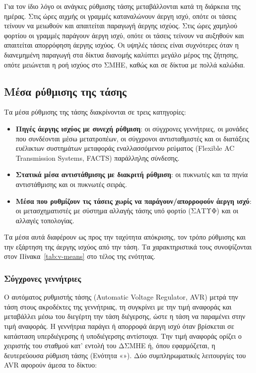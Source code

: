 Για τον ίδιο λόγο οι ανάγκες ρύθμισης τάσης μεταβάλλονται κατά τη διάρκεια της ημέρας. Στις
ώρες αιχμής οι γραμμές καταναλώνουν άεργη ισχύ, οπότε οι τάσεις τείνουν να μειωθούν και
απαιτείται παραγωγή άεργης ισχύος. Στις ώρες χαμηλού φορτίου οι γραμμές παράγουν άεργη ισχύ,
οπότε οι τάσεις τείνουν να αυξηθούν και απαιτείται απορρόφηση άεργης ισχύος. Οι υψηλές τάσεις
είναι συχνότερες όταν η διανεμημένη παραγωγή στα δίκτυα διανομής καλύπτει μεγάλο μέρος της
ζήτησης, οπότε μειώνεται η ροή ισχύος στο ΣΜΗΕ, καθώς και σε δίκτυα με πολλά καλώδια.

\subsection{Μέσα ρύθμισης της τάσης}
\label{sec:q-sources}

Τα μέσα ρύθμισης της τάσης διακρίνονται σε τρεις κατηγορίες:

\begin{itemize}
\item \textbf{Πηγές άεργης ισχύος με συνεχή ρύθμιση}: οι σύγχρονες γεννήτριες, οι μονάδες που
      συνδέονται μέσω μετατροπέων, οι σύγχρονοι αντισταθμιστές και οι διατάξεις ευέλικτων
      συστημάτων μεταφοράς εναλλασσόμενου ρεύματος (Flexible AC Transmission Systems, FACTS)
      παράλληλης σύνδεσης.
\item \textbf{Στατικά μέσα αντιστάθμισης με διακριτή ρύθμιση}: οι πυκνωτές και τα πηνία
      αντιστάθμισης και οι πυκνωτές σειράς.
\item \textbf{Μέσα που ρυθμίζουν τις τάσεις χωρίς να παράγουν/απορροφούν άεργη ισχύ}: οι
      μετασχηματιστές με σύστημα αλλαγής τάσης υπό φορτίο (ΣΑΤΥΦ) και οι αλλαγές τοπολογίας.
\end{itemize}

Τα μέσα αυτά διαφέρουν ως προς την ταχύτητα απόκρισης, τον τρόπο ρύθμισης και την εξάρτηση
της άεργης ισχύος από την τάση. Τα χαρακτηριστικά τους συνοψίζονται στον
Πίνακα~\ref{tab:v-means} στο τέλος της ενότητας.

\subsubsection{Σύγχρονες γεννήτριες}
\label{sec:sg}

Ο αυτόματος ρυθμιστής τάσης (Automatic Voltage Regulator, AVR) μετρά την τάση στους
ακροδέκτες της γεννήτριας, τη συγκρίνει με την τιμή αναφοράς και μεταβάλλει μέσω του διεγέρτη
την τάση διέγερσης, ώστε η τάση να παραμένει στην τιμή αναφοράς. Η γεννήτρια παράγει ή
απορροφά άεργη ισχύ όταν βρίσκεται σε κατάσταση υπερδιέγερσης ή υποδιέγερσης αντίστοιχα.
Την τιμή αναφοράς ορίζει ο χειριστής του σταθμού κατ' εντολή του ΔΣΜΗΕ ή, όπου
εφαρμόζεται, η δευτερεύουσα
ρύθμιση τάσης (Ενότητα «»). Δύο συμπληρωματικές λειτουργίες του AVR
αφορούν άμεσα το δίκτυο:

